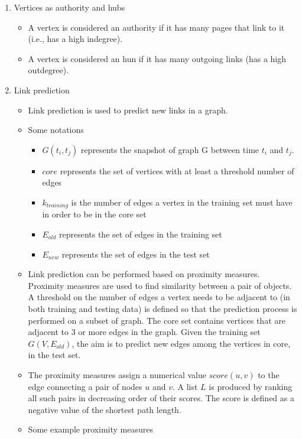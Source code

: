 \documentclass[14pt]{article}
\begin{document}
\begin{enumerate}
    \item Vertices as authority and hubs
     \begin{itemize}
      \item A vertex is considered an authority if it has many pages that link to it (i.e., has a high indegree).
      \item A vertex is considered an hun if it has many outgoing links (has a high outdegree).
     \end{itemize}
     
     \item Link prediction
      \begin{itemize}
       \item Link prediction is used to predict new links in a graph. 
       \item Some notations
        \begin{itemize}
         \item $G(t_i, t_j)$ represents the snapshot of graph G between time $t_i$ and $t_j$.
         \item $core$ represents the set of vertices with at least a threshold number of edges
         \item $k_{training}$ is the number of edges a vertex in the training set must have in order to be in the core set
         \item $E_{old}$ represents the set of edges in the training set
         \item $E_{new}$ represents the set of edges in the test set 
        \end{itemize}
        \item Link prediction can be performed based on proximity measures. Proximity measures are used to find similarity between a pair of objects. A threshold on the number of edges a vertex needs to be adjacent to (in both training and testing data) is defined so that the prediction process is performed on a subset of graph. The core set contains vertices that are adjacent to 3 or more edges in the graph. Given the training set $G(V,E_{old})$, the aim is to predict new edges among the vertices in core, in the test set. 
        \item The proximity measures assign a numerical value $score(u,v)$ to the edge connecting a pair of nodes $u$ and $v$. A list $L$ is produced by ranking all such pairs in decreasing order of their scores. The score is defined as a negative value of the shortest path length. 
        \item Some example proximity measures 

\end{itemize}
\end{enumerate}
\end{document}

